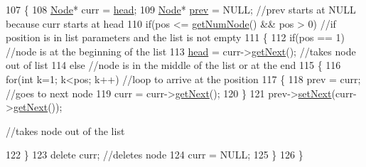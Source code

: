 \begin{DoxyCode}
107 \{
108    \hyperlink{classNode}{Node}* curr = \hyperlink{classLinkedList_a35e09287e2d2943707b011208e7a8ed2}{head};
109    \hyperlink{classNode}{Node}* \hyperlink{classNode_ac953360c5f7ffae6ad13762189d34d9c}{prev} = NULL; \textcolor{comment}{//prev starts at NULL because curr starts at head                            
                                                                                                               }
110    \textcolor{keywordflow}{if}(pos <= \hyperlink{classLinkedList_ae04dbbcae32f8fb03dce3e174854981f}{getNumNode}() && pos > 0) \textcolor{comment}{//if position is in list parameters and the list is not
       empty                                                                                                         }
111    \{
112       \textcolor{keywordflow}{if}(pos == 1) \textcolor{comment}{//node is at the beginning of the list                                                  
                                                                                                       }
113          \hyperlink{classLinkedList_a35e09287e2d2943707b011208e7a8ed2}{head} = curr->\hyperlink{classNode_af8f2d178f274dd254e6e1965971f0fd0}{getNext}(); \textcolor{comment}{//takes node out of list                                       
                                                                                                                  }
114       \textcolor{keywordflow}{else} \textcolor{comment}{//node is in the middle of the list or at the end                                               
                                                                                                       }
115       \{
116          \textcolor{keywordflow}{for}(\textcolor{keywordtype}{int} k=1; k<pos; k++) \textcolor{comment}{//loop to arrive at the position                                         
                                                                                                       }
117          \{
118             prev = curr; \textcolor{comment}{//goes to next node                                                               
                                                                                                       }
119             curr = curr->\hyperlink{classNode_af8f2d178f274dd254e6e1965971f0fd0}{getNext}();
120          \}
121          prev->\hyperlink{classNode_a0f69ba4f73cd616755f4ec0ae9fa7f96}{setNext}(curr->\hyperlink{classNode_af8f2d178f274dd254e6e1965971f0fd0}{getNext}()); \textcolor{comment}{//takes node out of the list                        
                                                                                                                  
         }
122       \}
123       \textcolor{keyword}{delete} curr; \textcolor{comment}{//deletes node                                                                          
                                                                                                       }
124       curr = NULL;
125    \}
126 \}
\end{DoxyCode}


